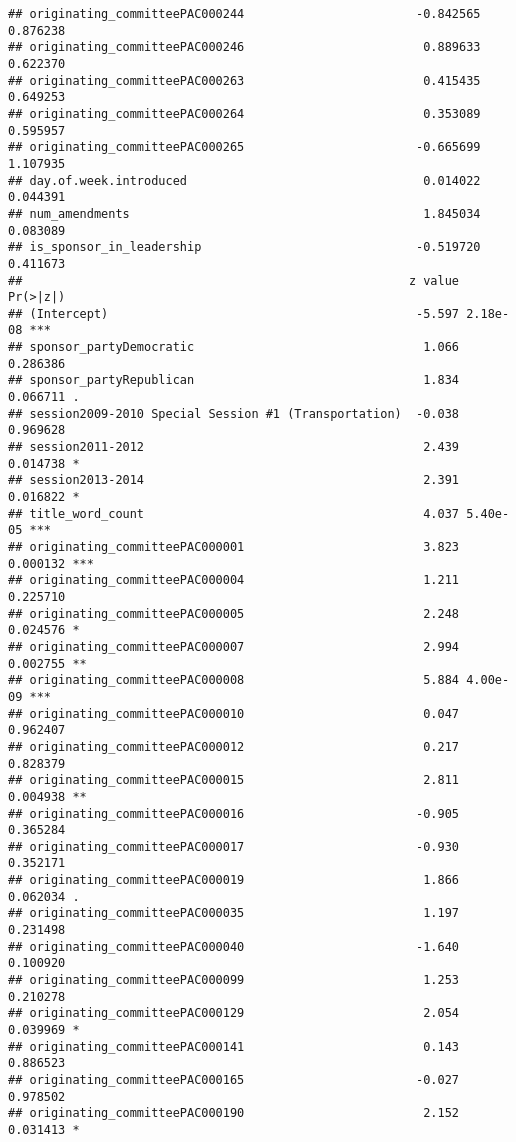 \documentclass[]{article}
\begin{document}
\begin{verbatim}
## originating_committeePAC000244                        -0.842565   0.876238
## originating_committeePAC000246                         0.889633   0.622370
## originating_committeePAC000263                         0.415435   0.649253
## originating_committeePAC000264                         0.353089   0.595957
## originating_committeePAC000265                        -0.665699   1.107935
## day.of.week.introduced                                 0.014022   0.044391
## num_amendments                                         1.845034   0.083089
## is_sponsor_in_leadership                              -0.519720   0.411673
##                                                      z value Pr(>|z|)    
## (Intercept)                                           -5.597 2.18e-08 ***
## sponsor_partyDemocratic                                1.066 0.286386    
## sponsor_partyRepublican                                1.834 0.066711 .  
## session2009-2010 Special Session #1 (Transportation)  -0.038 0.969628    
## session2011-2012                                       2.439 0.014738 *  
## session2013-2014                                       2.391 0.016822 *  
## title_word_count                                       4.037 5.40e-05 ***
## originating_committeePAC000001                         3.823 0.000132 ***
## originating_committeePAC000004                         1.211 0.225710    
## originating_committeePAC000005                         2.248 0.024576 *  
## originating_committeePAC000007                         2.994 0.002755 ** 
## originating_committeePAC000008                         5.884 4.00e-09 ***
## originating_committeePAC000010                         0.047 0.962407    
## originating_committeePAC000012                         0.217 0.828379    
## originating_committeePAC000015                         2.811 0.004938 ** 
## originating_committeePAC000016                        -0.905 0.365284    
## originating_committeePAC000017                        -0.930 0.352171    
## originating_committeePAC000019                         1.866 0.062034 .  
## originating_committeePAC000035                         1.197 0.231498    
## originating_committeePAC000040                        -1.640 0.100920    
## originating_committeePAC000099                         1.253 0.210278    
## originating_committeePAC000129                         2.054 0.039969 *  
## originating_committeePAC000141                         0.143 0.886523    
## originating_committeePAC000165                        -0.027 0.978502    
## originating_committeePAC000190                         2.152 0.031413 *  

\end{verbatim}
\end{document}
